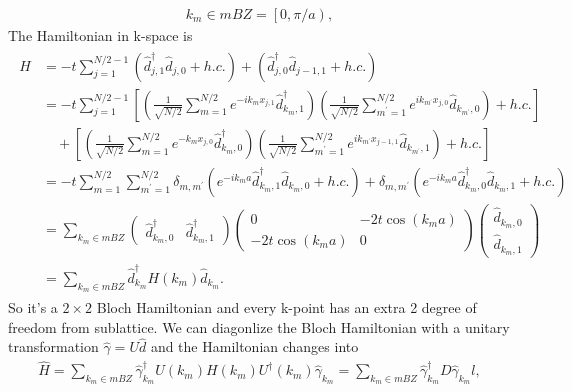 \documentclass[10pt, oneside]{article}
\newcommand{\p}[1]{\left(#1\right)}
\newcommand{\bb}[1]{\left[#1\right]}
\begin{document}
\begin{align}
	k_{m} \in mBZ = \left[0,\pi/a \right),
\end{align}
The Hamiltonian in k-space is 
\begin{align}
	\begin{split}
		\hat{H} & = -t \sum_{j = 1}^{N/2 - 1} \p{\hat{d}^{\dagger}_{j,1}\hat{d}_{j,0} + h.c.} + \p{\hat{d}^{\dagger}_{j,0}\hat{d}_{j - 1,1} + h.c.}  \\
		& = -t \sum_{j = 1}^{N/2 - 1} \bb{ \p{\frac{1}{\sqrt{N/2}} \sum_{m = 1}^{N/2} e^{-i k_{m} x_{j,1}} \hat{d}^{\dagger}_{k_{m}, 1}}\p{\frac{1}{\sqrt{N/2}} \sum_{m^\prime = 1}^{N/2} e^{i k_{m^\prime} x_{j,0}} \hat{d}_{k_{m^\prime},0} } + h.c.} \\
		& \quad + \bb{\p{\frac{1}{\sqrt{N/2}} \sum_{m = 1}^{N/2} e^{- k_{m} x_{j,0} }\hat{d}^{\dagger}_{k_m, 0} } \p{\frac{1}{\sqrt{N/2}} \sum_{m^\prime = 1}^{N/2} e^{i k_{m^\prime} x_{j-1, 1}} \hat{d}_{k_{m^\prime}, 1}} + h.c.} \\
		& = -t  \sum_{m = 1}^{N/2} \sum_{m^\prime = 1}^{N/2} \delta_{m, m^\prime} \p{e^{-i k_{m} a} \hat{d}^{\dagger}_{k_{m}, 1} \hat{d}_{k_{m}, 0} + h.c.} + \delta_{m, m^\prime} \p{e^{-i k_{m} a} \hat{d}^{\dagger}_{k_{m}, 0} \hat{d}_{k_{m}, 1} + h.c.} \\
		& = \sum_{k_{m} \in mBZ} \begin{pmatrix}
			\hat{d}^{\dagger}_{k_{m}, 0} & \hat{d}^{\dagger}_{k_{m}, 1}
		\end{pmatrix}
		\begin{pmatrix}
			0 & -2t \cos\p{k_{m} a} \\
			-2t \cos\p{k_{m} a} & 0
		\end{pmatrix}
		\begin{pmatrix}
			\hat{d}_{k_{m}, 0} \\ \hat{d}_{k_{m}, 1}
		\end{pmatrix} \\
		& =  \sum_{k_{m} \in mBZ} \hat{d}^{\dagger}_{k_{m}} H\p{k_m} \hat{d}_{k_{m}}.
	\end{split}
\end{align}
So it's a \(2 \times 2\) Bloch Hamiltonian and every k-point has an extra 2 degree of freedom from sublattice. We can diagonlize the Bloch Hamiltonian with a unitary transformation \(\hat{\gamma} = U  \hat{d}\) and the Hamiltonian changes into 
\begin{align}
	\hat{H} = \sum_{k_{m} \in mBZ} \hat{\gamma}^{\dagger}_{k_m} U \p{k_{m}} H \p{k_m} U^{\dagger} \p{k_m} \hat{\gamma}_{k_m} = \sum_{k_{m} \in mBZ} \hat{\gamma}^{\dagger}_{k_m} D \hat{\gamma}_{k_m}l,
\end{align}
\end{document}
